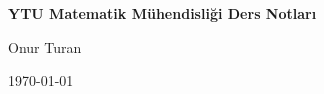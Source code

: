 \documentclass[12pt,a4paper]{book}
\begin{document}
\frontmatter
\begin{titlepage}
    \centering
    {\Huge \textbf{YTU Matematik Mühendisliği Ders Notları}}\vspace{1.5em}\par
    {\Large Onur Turan}\vspace{1em}\par
    {\large \today}\par
\end{titlepage}
\tableofcontents

\mainmatter


\end{document}
